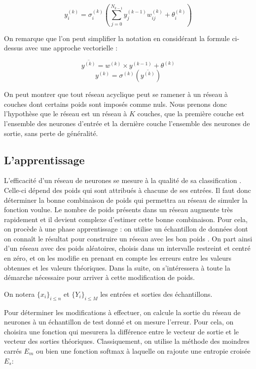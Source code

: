 \[y_i^{(k)} = \sigma_i^{(k)}(\sum_{j = 0}^{N_{k-1}} y_j^{(k-1)}w_{ij}^{(k)} + \theta_i^{(k)}) \]

On remarque que l'on peut simplifier la notation en considérant la formule
ci-dessus avec une approche vectorielle :

\[\overline{y^{(k)}} = w^{(k)} \times y^{(k-1)} + \theta^{(k)}\]
\[y^{(k)} = \sigma^{(k)}(\overline{y^{(k)}}) \]

On peut montrer que tout réseau acyclique peut se ramener à un réseau à couches
dont certains poids sont imposés comme nuls. Nous prenons donc l'hypothèse que
le réseau est un réseau à $K$ couches, que la première couche est l'ensemble des
 neurones d'entrée et la dernière couche l'ensemble des neurones de sortie, sans
 perte de généralité.

\subsection{L'apprentissage}

L'efficacité d'un réseau de neurones se mesure à la qualité de sa classification
. Celle-ci dépend des poids qui sont attribués à chacune de ses entrées. Il faut
 donc déterminer la bonne combinaison de poids qui permettra au réseau de
simuler la fonction voulue. Le nombre de poids présents dans un réseau augmente
très rapidement et il devient complexe d'estimer cette bonne combinaison. Pour
cela, on procède à une phase apprentissage : on utilise un échantillon de
données dont on connaît le résultat pour construire un réseau avec les bon poids
. On part ainsi d'un réseau avec des poids aléatoires, choisis dans un
intervalle restreint et centré en zéro, et on les modifie en prenant en compte
les erreurs entre les valeurs obtenues et les valeurs théoriques. Dans la suite,
 on s'intéressera à toute la démarche nécessaire pour arriver à cette modification de poids.

\medskip

On notera $\{x_i\}_{i \leq n}$ et $\{Y_i\}_{i \leq M}$ les entrées et sorties
des échantillons.

\medskip

Pour déterminer les modifications à effectuer, on calcule la sortie du réseau de
 neurones à un échantillon de test donné et on mesure l'erreur. Pour cela,
on choisira une fonction qui mesurera la différence entre le vecteur de sortie
et le vecteur des sorties théoriques. Classiquement, on utilise la méthode des
moindres carrés $E_m$ ou bien une fonction softmax à laquelle on rajoute une
entropie croisée $E_s$:

